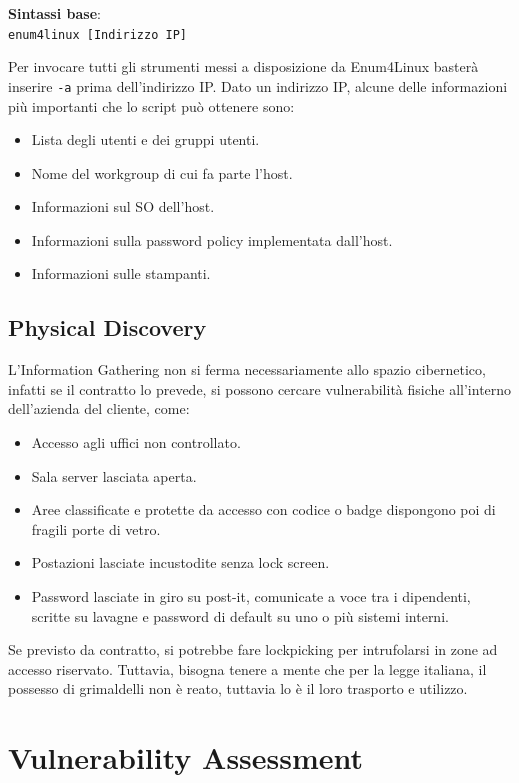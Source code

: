 \documentclass{article}
\begin{document}
\textbf{Sintassi base}:\\
\verb|enum4linux [Indirizzo IP]|

Per invocare tutti gli strumenti messi a disposizione da Enum4Linux basterà inserire \verb|-a| prima dell'indirizzo IP. Dato un indirizzo IP, alcune delle informazioni più importanti che lo script può ottenere sono:
\begin{itemize}
    \item Lista degli utenti e dei gruppi utenti.
    \item Nome del workgroup di cui fa parte l'host.
    \item Informazioni sul SO dell'host.
    \item Informazioni sulla password policy implementata dall’host.
    \item Informazioni sulle stampanti.
\end{itemize}
\newpage
\subsection{Physical Discovery}
L’Information Gathering non si ferma necessariamente allo spazio cibernetico, infatti se il contratto lo prevede, si possono cercare vulnerabilità fisiche all'interno dell'azienda del cliente, come:
\begin{itemize}
    \item Accesso agli uffici non controllato.
    \item Sala server lasciata aperta.
    \item Aree classificate e protette da accesso con codice o badge dispongono poi di fragili porte di vetro.
    \item Postazioni lasciate incustodite senza lock screen.
    \item Password lasciate in giro su post-it, comunicate a voce tra i dipendenti, scritte su lavagne e password di default su uno o più sistemi interni.
\end{itemize}

Se previsto da contratto, si potrebbe fare lockpicking per intrufolarsi in zone ad accesso riservato. Tuttavia, bisogna tenere a mente che per la legge italiana, il possesso di grimaldelli non è reato, tuttavia lo è 
il loro trasporto e utilizzo.

\newpage

\section{Vulnerability Assessment}
\end{document}
